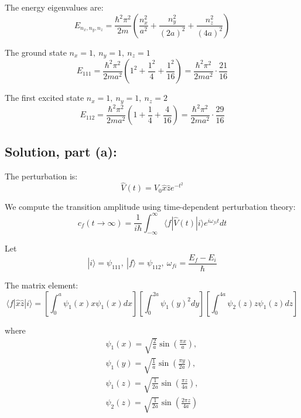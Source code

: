 \documentclass[12pt]{article}
\begin{document}
        The energy eigenvalues are:
        \[
            E_{n_x,n_y,n_z} = \frac{\hbar^2 \pi^2}{2m} \left( \frac{n_x^2}{a^2} + \frac{n_y^2}{(2a)^2} + \frac{n_z^2}{(4a)^2} \right)
        \]
        
        The ground state \( n_x = 1,\ n_y = 1,\ n_z = 1 \)
        \[
            E_{111} = \frac{\hbar^2 \pi^2}{2m a^2} \left( 1^2 + \frac{1^2}{4} + \frac{1^2}{16} \right) = \frac{\hbar^2 \pi^2}{2m a^2} \cdot \frac{21}{16}
        \]
        
        The first excited state \( n_x = 1,\ n_y = 1,\ n_z = 2 \)
        \[
            E_{112} = \frac{\hbar^2 \pi^2}{2m a^2} \left( 1 + \frac{1}{4} + \frac{4}{16} \right) = \frac{\hbar^2 \pi^2}{2m a^2} \cdot \frac{29}{16}
        \]
        
    \subsection{Solution, part (a):}
        The perturbation is:
        \[
            \hat{V}(t) = V_0 \hat{x} \hat{z} e^{-t^2}
        \]
        
        We compute the transition amplitude using time-dependent perturbation theory:
        \[
            c_f(t \to \infty) = \frac{1}{i\hbar} \int_{-\infty}^{\infty} \langle f | \hat{V}(t) | i \rangle e^{i\omega_{fi} t} dt
        \]
        
        Let 
        \[ 
            |i\rangle = \psi_{111},\ |f\rangle = \psi_{112},\ \omega_{fi} = \frac{E_f - E_i}{\hbar} 
        \]
        
        The matrix element:
        \[
            \langle f | \hat{x} \hat{z} | i \rangle = \left[ \int_0^a \psi_1(x) x \psi_1(x) dx \right]
            \left[ \int_0^{2a} \psi_1(y)^2 dy \right]
            \left[ \int_0^{4a} \psi_2(z) z \psi_1(z) dz \right]
        \]
        
        where
        \begin{equation}
            \begin{split}
                \psi_1(x) = \sqrt{\frac{2}{a}} \sin\left(\frac{\pi x}{a}\right),\\
                \psi_1(y) = \sqrt{\frac{1}{a}} \sin\left(\frac{\pi y}{2a}\right),\\
                \psi_1(z) = \sqrt{\frac{1}{2a}} \sin\left(\frac{\pi z}{4a}\right),\\
                \psi_2(z) = \sqrt{\frac{1}{2a}} \sin\left(\frac{2\pi z}{4a}\right)
            \end{split}
        \end{equation}  
        
\end{document}
